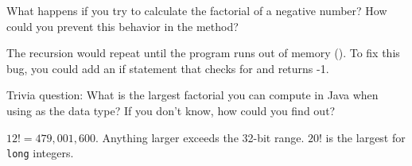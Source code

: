 \Q \label{stackover}
What happens if you try to calculate the factorial of a negative number?
How could you prevent this behavior in the  method?

\begin{answer}
The recursion would repeat until the program runs out of memory ().
To fix this bug, you could add an if statement that checks for  and returns -1.
\end{answer}


\Q Trivia question: What is the largest factorial you can compute in Java when using  as the data type? If you don't know, how could you find out?

\begin{answer}
$12! = 479,001,600$. Anything larger exceeds the 32-bit range. $20!$ is the largest for \texttt{long} integers.
\end{answer}
